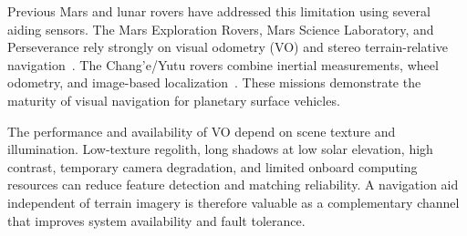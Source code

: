 \documentclass[]{IAC_style}
\begin{document}
Previous Mars and lunar rovers have addressed this limitation using several aiding sensors. The Mars Exploration Rovers, Mars Science Laboratory, and Perseverance rely strongly on visual odometry (VO) and stereo terrain-relative navigation~\cite{maimone2007mer,rankin2021curiosity,maki2020mars2020}. The Chang'e/Yutu rovers combine inertial measurements, wheel odometry, and image-based localization~\cite{ma2020yutu2}. These missions demonstrate the maturity of visual navigation for planetary surface vehicles.

The performance and availability of VO depend on scene texture and illumination. Low-texture regolith, long shadows at low solar elevation, high contrast, temporary camera degradation, and limited onboard computing resources can reduce feature detection and matching reliability. A navigation aid independent of terrain imagery is therefore valuable as a complementary channel that improves system availability and fault tolerance.
\end{document}
